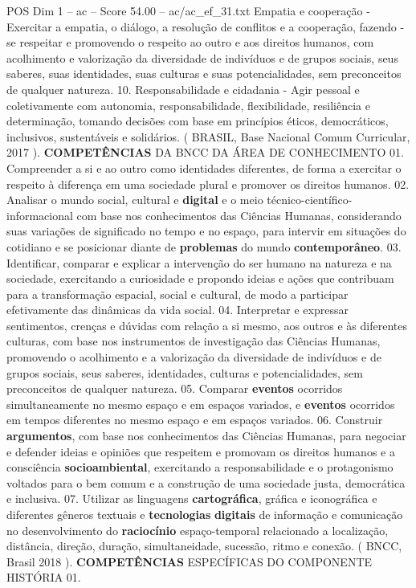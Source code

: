 \begin{textsample}{POS Dim 1 – ac – Score 54.00 – ac/ac\_ef\_31.txt}
Empatia e cooperação - Exercitar a empatia, o diálogo, a resolução de conflitos e a cooperação, fazendo -se respeitar e promovendo o respeito ao outro e aos direitos humanos, com acolhimento e valorização da diversidade de indivíduos e de grupos sociais, seus saberes, suas identidades, suas culturas e suas potencialidades, sem preconceitos de qualquer natureza. 10.
Responsabilidade e cidadania - Agir pessoal e coletivamente com autonomia, responsabilidade, flexibilidade, resiliência e determinação, tomando decisões com base em princípios éticos, democráticos, inclusivos, sustentáveis e solidários. ( BRASIL, Base Nacional Comum Curricular, 2017 ). \textbf{COMPETÊNCIAS} DA BNCC DA ÁREA DE CONHECIMENTO 01.
Compreender a si e ao outro como identidades diferentes, de forma a exercitar o respeito à diferença em uma sociedade plural e promover os direitos humanos. 02.
Analisar o mundo social, cultural e \textbf{digital} e o meio técnico-científico-informacional com base nos conhecimentos das Ciências Humanas, considerando suas variações de significado no tempo e no espaço, para intervir em situações do cotidiano e se posicionar diante de \textbf{problemas} do mundo \textbf{contemporâneo}. 03.
Identificar, comparar e explicar a intervenção do ser humano na natureza e na sociedade, exercitando a curiosidade e propondo ideias e ações que contribuam para a transformação espacial, social e cultural, de modo a participar efetivamente das dinâmicas da vida social. 04.
Interpretar e expressar sentimentos, crenças e dúvidas com relação a si mesmo, aos outros e às diferentes culturas, com base nos instrumentos de investigação das Ciências Humanas, promovendo o acolhimento e a valorização da diversidade de indivíduos e de grupos sociais, seus saberes, identidades, culturas e potencialidades, sem preconceitos de qualquer natureza. 05.
Comparar \textbf{eventos} ocorridos simultaneamente no mesmo espaço e em espaços variados, e \textbf{eventos} ocorridos em tempos diferentes no mesmo espaço e em espaços variados. 06.
Construir \textbf{argumentos}, com base nos conhecimentos das Ciências Humanas, para negociar e defender ideias e opiniões que respeitem e promovam os direitos humanos e a consciência \textbf{socioambiental}, exercitando a responsabilidade e o protagonismo voltados para o bem comum e a construção de uma sociedade justa, democrática e inclusiva. 07.
Utilizar as linguagens \textbf{cartográfica}, gráfica e iconográfica e diferentes gêneros textuais e \textbf{tecnologias} \textbf{digitais} de informação e comunicação no desenvolvimento do \textbf{raciocínio} espaço-temporal relacionado a localização, distância, direção, duração, simultaneidade, sucessão, ritmo e conexão. ( BNCC, Brasil 2018 ). \textbf{COMPETÊNCIAS} ESPECÍFICAS DO COMPONENTE HISTÓRIA 01.

\end{textsample}
